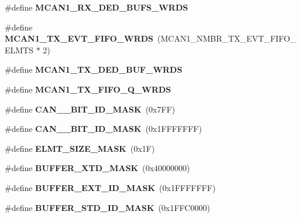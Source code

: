 \begin{DoxyCompactItemize}
\item 
\#define {\bfseries M\+C\+A\+N1\+\_\+\+R\+X\+\_\+\+D\+E\+D\+\_\+\+B\+U\+F\+S\+\_\+\+W\+R\+DS}
\item 
\mbox{\label{group__can__module_ga53c6ce42458bf11d8b253f75b0eb5554}} 
\#define {\bfseries M\+C\+A\+N1\+\_\+\+T\+X\+\_\+\+E\+V\+T\+\_\+\+F\+I\+F\+O\+\_\+\+W\+R\+DS}~(M\+C\+A\+N1\+\_\+\+N\+M\+B\+R\+\_\+\+T\+X\+\_\+\+E\+V\+T\+\_\+\+F\+I\+F\+O\+\_\+\+E\+L\+M\+TS $\ast$ 2)
\item 
\#define {\bfseries M\+C\+A\+N1\+\_\+\+T\+X\+\_\+\+D\+E\+D\+\_\+\+B\+U\+F\+\_\+\+W\+R\+DS}
\item 
\#define {\bfseries M\+C\+A\+N1\+\_\+\+T\+X\+\_\+\+F\+I\+F\+O\+\_\+\+Q\+\_\+\+W\+R\+DS}
\item 
\mbox{\label{group__can__module_gae5ffdcb18ef8a39615c363ed316c96ce}} 
\#define {\bfseries C\+A\+N\+\_\+\_\+\+B\+I\+T\+\_\+\+I\+D\+\_\+\+M\+A\+SK}~(0x7\+F\+F)
\item 
\mbox{\label{group__can__module_ga112b6ee3f7d23aa9f1ebbb98c397f3a9}} 
\#define {\bfseries C\+A\+N\+\_\+\_\+\+B\+I\+T\+\_\+\+I\+D\+\_\+\+M\+A\+SK}~(0x1\+F\+F\+F\+F\+F\+F\+F)
\item 
\mbox{\label{group__can__module_gaf8db7524bf7a0f167e5de0dbeb5bdd34}} 
\#define {\bfseries E\+L\+M\+T\+\_\+\+S\+I\+Z\+E\+\_\+\+M\+A\+SK}~(0x1\+F)
\item 
\mbox{\label{group__can__module_ga55b5725db3daceaed8d3228ef56b7328}} 
\#define {\bfseries B\+U\+F\+F\+E\+R\+\_\+\+X\+T\+D\+\_\+\+M\+A\+SK}~(0x40000000)
\item 
\mbox{\label{group__can__module_ga3651830664dcb9ab66cf527cce41bca2}} 
\#define {\bfseries B\+U\+F\+F\+E\+R\+\_\+\+E\+X\+T\+\_\+\+I\+D\+\_\+\+M\+A\+SK}~(0x1\+F\+F\+F\+F\+F\+F\+F)
\item 
\mbox{\label{group__can__module_ga32a0328ab0425a683ff66e834c3b783c}} 
\#define {\bfseries B\+U\+F\+F\+E\+R\+\_\+\+S\+T\+D\+\_\+\+I\+D\+\_\+\+M\+A\+SK}~(0x1\+F\+F\+C0000)
\item 
\mbox{\label{group__can__module_gafb5e2a8467698815a2f243d75bfdd398}} 

\end{DoxyCompactItemize}
